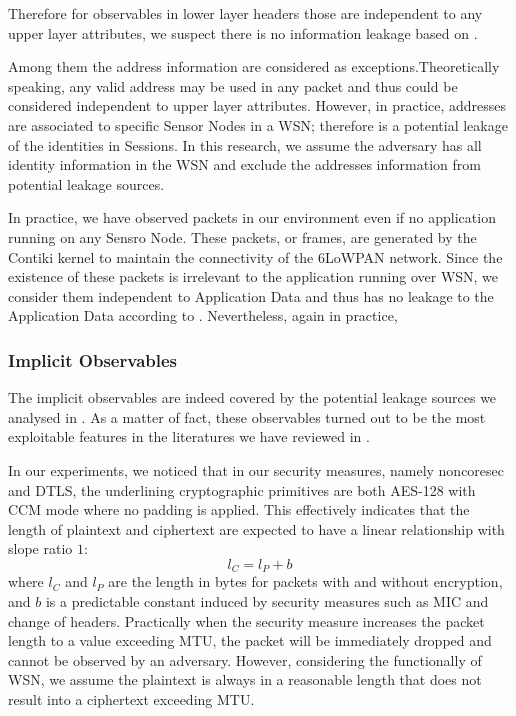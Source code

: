 Therefore for observables in lower layer headers those are independent to any upper layer attributes, we suspect there is no information leakage based on .

Among them the address information are considered as exceptions.Theoretically speaking, any valid address may be used in any packet and thus could be considered independent to upper layer attributes. However, in practice, addresses are associated to specific Sensor Nodes in a WSN; therefore is a potential leakage of the identities in Sessions. In this research, we assume the adversary has all identity information in the WSN and exclude the addresses information from potential leakage sources.

In practice, we have observed packets in our environment even if no application running on any Sensro Node. These packets, or frames, are generated by the Contiki kernel to maintain the connectivity of the 6LoWPAN network. Since the existence of these packets is irrelevant to the application running over WSN, we consider them independent to Application Data and thus has no leakage to the Application Data according to . Nevertheless, again in practice, 

\subsubsection{Implicit Observables}

The implicit observables are indeed covered by the potential leakage sources we analysed in . As a matter of fact, these observables turned out to be the most exploitable features in the literatures we have reviewed in .

In our experiments, we noticed that in our security measures, namely noncoresec and DTLS, the underlining cryptographic primitives are both AES-128 with CCM mode where no padding is applied. This effectively indicates that the length of plaintext and ciphertext are expected to have a linear relationship with slope ratio $1$:
\begin{equation} \label{Eq: Linear Length}
	l_{C} = l_{P} + b
\end{equation}
where $l_{C}$ and $l_{P}$ are the length in bytes for packets with and without encryption, and $b$ is a predictable constant induced by security measures such as MIC and change of headers. Practically when the security measure increases the packet length to a value exceeding MTU, the packet will be immediately dropped and cannot be observed by an adversary. However, considering the functionally of WSN, we assume the plaintext is always in a reasonable length that does not result into a ciphertext exceeding MTU.

